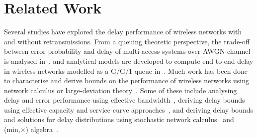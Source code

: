 \section{Related Work}
Several studies have explored the delay performance of wireless networks with and without retransmissions.
From a queuing theoretic perspective, the trade-off between error probability and delay of multi-access systems over AWGN channel is analysed in~\cite{Telatar1995}, and analytical models are developed to compute end-to-end delay in wireless networks modelled as a G/G/1 queue in~\cite{bisnik2006queuing}.
Much work has been done to characterise and derive bounds on the performance of wireless networks using network calculus or large-deviation theory~\cite{devassy2019reliable,Zubaidi2016,yeh2012fundamental,petreska2019bound}.
Some of these include analysing delay and error performance using effective bandwidth~\cite{chang1995EB,hassan2004markov}, 
deriving delay bounds using effective capacity and service curve approaches~\cite{wu2003effectiveCap,fidler2006wlc15},
and deriving delay bounds and solutions for delay distributions using stochastic network calculus~\cite{jiang2008SNC,Ciucu2010} and (min,×) algebra~\cite{Zubaidi2016}.



